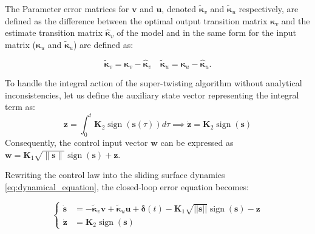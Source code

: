 \documentclass[sn-mathphys-num]{sn-jnl}
\DeclareMathOperator{\sign}{sign}
\theoremstyle{thmstyleone}%
\theoremstyle{thmstyletwo}%
\theoremstyle{thmstylethree}%
\begin{document}
The Parameter error matrices for $\mathbf{v}$ and $\mathbf{u}$, denoted $\boldsymbol{\tilde{\kappa}}_v$ and $\boldsymbol{\tilde{\kappa}}_u$ respectively, are defined as the difference between the optimal output transition matrix $\boldsymbol{\kappa}_v$ and the estimate transition matrix $\boldsymbol{\hat{\kappa}}_v$ of the model  and in the same form for the input matrix ($\boldsymbol{\kappa}_u$ and $\boldsymbol{\tilde{\kappa}}_u$) are defined as:  

\begin{equation}
            \boldsymbol{\tilde{\kappa}}_v = \boldsymbol{\kappa}_v - \boldsymbol{\hat{\kappa}}_v \quad \boldsymbol{\tilde{\kappa}}_u = \boldsymbol{\kappa}_u- \boldsymbol{\hat{\kappa}}_u. \label{eq:error estimation}
\end{equation}


To handle the integral action of the super-twisting algorithm without analytical inconsistencies, let us define the auxiliary state vector representing the integral term as:
\begin{equation}
    \mathbf{z} = \int_{0}^{t} \mathbf{K}_2\sign(\mathbf{s}(\tau)) d\tau \implies \dot{\mathbf{z}} = \mathbf{K}_2\sign(\mathbf{s})
\end{equation}
Consequently, the control input vector $\mathbf{w}$ can be expressed as $\mathbf{w} = \mathbf{K}_1\sqrt{\|\mathbf{s}\|}\sign(\mathbf{s}) + \mathbf{z}$. 

Rewriting the control law into the sliding surface dynamics \eqref{eq:dynamical_equation}, the closed-loop error equation becomes:


\begin{equation}\label{eq:SuperficieFinal}
\left\{
\begin{aligned}
  \dot{\mathbf{s}} &=-\boldsymbol{\tilde{\kappa}}_v\mathbf{v}+\boldsymbol{\tilde{\kappa}}_u\mathbf{u}+\boldsymbol{\delta}(t)- \mathbf{K}_1\sqrt{||\mathbf{s}||}\sign(\mathbf{s}) -\mathbf{z}\\
  \dot{\mathbf{z}} &=\mathbf{K}_2\sign(\mathbf{s})
\end{aligned}
\right.
\end{equation}
\end{document}
